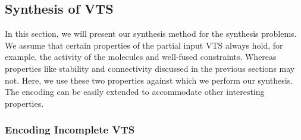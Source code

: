 \subsection{Synthesis of VTS}
In this section, we will present our synthesis method for
the synthesis problems.
%
We assume that certain properties of the partial input VTS always hold, for example, the activity of the molecules and well-fused constraints. 
%
Whereas properties like stability and connectivity discussed in the previous sections may not.
%
Here, we use these two properties against which we perform our synthesis. 
%
The encoding can be easily extended to accommodate other interesting properties. 

\subsubsection{Encoding Incomplete VTS}


